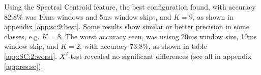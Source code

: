 %			
		
		Using the Spectral Centroid feature, the best configuration found, with accuracy 82.8\% was 10ms windows and 5ms window skips, and $K=9$, as shown in appendix \ref{app:sc:9:best}. Some results show similar or better precision in some classes, e.g. $K=8$. The worst accuracy seen, was usisng 20ms window size, 10ms window skip, and $K=2$, with accuracy 73.8\%, as shown in table \ref{app:SC:2:worst}. $X^2$-test revealed no significant differences (see all in appendix \ref{app:res:sc}).
		

